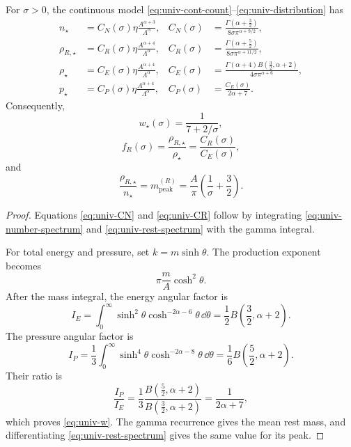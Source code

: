 \begin{theorem}
For $\sigma>0$, the continuous model \eqref{eq:univ-cont-count}--\eqref{eq:univ-distribution} has
\begin{align}
n_\star
&=C_N(\sigma)\eta\frac{A^{\alpha+3}}{\Lambda^\alpha},
&C_N(\sigma)
&=\frac{\Gamma(\alpha+\tfrac32)}
{8\sigma\pi^{\alpha+9/2}},
\label{eq:univ-CN}\\
\rho_{R,\star}
&=C_R(\sigma)\eta\frac{A^{\alpha+4}}{\Lambda^\alpha},
&C_R(\sigma)
&=\frac{\Gamma(\alpha+\tfrac52)}
{8\sigma\pi^{\alpha+11/2}},
\label{eq:univ-CR}\\
\rho_\star
&=C_E(\sigma)\eta\frac{A^{\alpha+4}}{\Lambda^\alpha},
&C_E(\sigma)
&=\frac{\Gamma(\alpha+4)B(\tfrac32,\alpha+2)}
{4\sigma\pi^{\alpha+6}},
\label{eq:univ-CE}\\
p_\star
&=C_P(\sigma)\eta\frac{A^{\alpha+4}}{\Lambda^\alpha},
&C_P(\sigma)
&=\frac{C_E(\sigma)}{2\alpha+7}.
\label{eq:univ-CP}
\end{align}
Consequently,
\begin{equation}
\boxed{
w_\star(\sigma)=\frac1{7+2/\sigma},}
\label{eq:univ-w}
\end{equation}
\begin{equation}
\boxed{
f_R(\sigma)=\frac{\rho_{R,\star}}{\rho_\star}
=\frac{C_R(\sigma)}{C_E(\sigma)},}
\label{eq:univ-rest-frac}
\end{equation}
and
\begin{equation}
\boxed{
\frac{\rho_{R,\star}}{n_\star}
=m_{\mathrm{peak}}^{(R)}
=\frac A\pi\left(\frac1\sigma+\frac32\right).}
\label{eq:univ-peak}
\end{equation}
\end{theorem}

\begin{proof}
Equations \eqref{eq:univ-CN} and \eqref{eq:univ-CR} follow by integrating \eqref{eq:univ-number-spectrum} and \eqref{eq:univ-rest-spectrum} with the gamma integral.

For total energy and pressure, set $k=m\sinh\theta$.  The production exponent becomes
\begin{equation}
\pi\frac mA\cosh^2\theta.
\end{equation}
After the mass integral, the energy angular factor is
\begin{equation}
I_E=\int_0^\infty
\sinh^2\theta\cosh^{-2\alpha-6}\theta\,\dd\theta
=\frac12B\left(\frac32,\alpha+2\right).
\end{equation}
The pressure angular factor is
\begin{equation}
I_P=\frac13\int_0^\infty
\sinh^4\theta\cosh^{-2\alpha-8}\theta\,\dd\theta
=\frac16B\left(\frac52,\alpha+2\right).
\end{equation}
Their ratio is
\begin{equation}
\frac{I_P}{I_E}
=\frac13\frac{B(\tfrac52,\alpha+2)}{B(\tfrac32,\alpha+2)}
=\frac1{2\alpha+7},
\end{equation}
which proves \eqref{eq:univ-w}.  The gamma recurrence gives the mean rest mass, and differentiating \eqref{eq:univ-rest-spectrum} gives the same value for its peak.
\end{proof}

